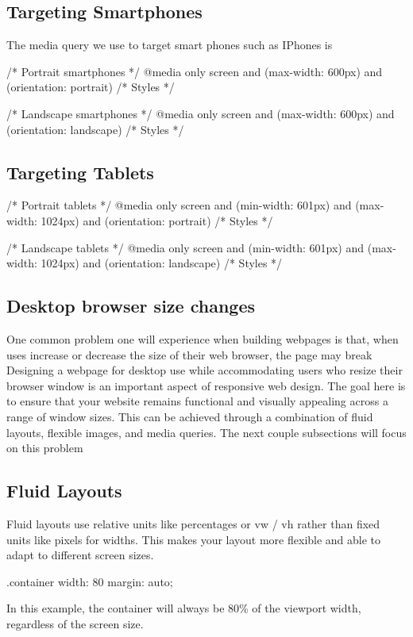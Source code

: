 \documentclass{report}
\begin{document}
    \bigbreak \noindent 
    \subsection{Targeting Smartphones}
    \bigbreak \noindent 
    The media query we use to target smart phones such as IPhones is
    \bigbreak \noindent 
    \begin{csscode}
    /* Portrait smartphones */
    @media only screen and (max-width: 600px) and (orientation: portrait) {
        /* Styles */
    }

    /* Landscape smartphones */
    @media only screen and (max-width: 600px) and (orientation: landscape) {
        /* Styles */
    } 
    \end{csscode}

    \bigbreak \noindent 
    \subsection{Targeting Tablets}
    \begin{csscode}
    /* Portrait tablets */
    @media only screen and (min-width: 601px) and (max-width: 1024px) and (orientation: portrait) {
        /* Styles */
    }

    /* Landscape tablets */
    @media only screen and (min-width: 601px) and (max-width: 1024px) and (orientation: landscape) {
        /* Styles */
    }
    \end{csscode}

    \pagebreak \bigbreak \noindent 
    \subsection{Desktop browser size changes}
    \bigbreak \noindent 
    One common problem one will experience when building webpages is that, when uses increase or decrease the size of their web browser, the page may break
    \bigbreak \noindent 
    Designing a webpage for desktop use while accommodating users who resize their browser window is an important aspect of responsive web design. The goal here is to ensure that your website remains functional and visually appealing across a range of window sizes. This can be achieved through a combination of fluid layouts, flexible images, and media queries.
    \bigbreak \noindent 
    The next couple subsections will focus on this problem

    \bigbreak \noindent 
    \subsection{Fluid Layouts}
    \bigbreak \noindent 
    Fluid layouts use relative units like percentages or vw / vh rather than fixed units like pixels for widths. This makes your layout more flexible and able to adapt to different screen sizes.
    \bigbreak \noindent 
    \begin{csscode}
    .container {
        width: 80%
        margin: auto;
    }
    \end{csscode}
    \bigbreak \noindent 
    In this example, the container will always be 80\% of the viewport width, regardless of the screen size.
\end{document}

